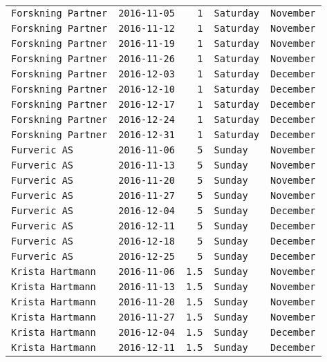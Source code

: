 \documentclass[11pt,A4paper,]{article}
\begin{document}
\begin{longtable}[]{@{}lrrll@{}}
\texttt{Forskning\ Partner} & \texttt{2016-11-05} & \texttt{1} &
\texttt{Saturday} & \texttt{November}\tabularnewline
\texttt{Forskning\ Partner} & \texttt{2016-11-12} & \texttt{1} &
\texttt{Saturday} & \texttt{November}\tabularnewline
\texttt{Forskning\ Partner} & \texttt{2016-11-19} & \texttt{1} &
\texttt{Saturday} & \texttt{November}\tabularnewline
\texttt{Forskning\ Partner} & \texttt{2016-11-26} & \texttt{1} &
\texttt{Saturday} & \texttt{November}\tabularnewline
\texttt{Forskning\ Partner} & \texttt{2016-12-03} & \texttt{1} &
\texttt{Saturday} & \texttt{December}\tabularnewline
\texttt{Forskning\ Partner} & \texttt{2016-12-10} & \texttt{1} &
\texttt{Saturday} & \texttt{December}\tabularnewline
\texttt{Forskning\ Partner} & \texttt{2016-12-17} & \texttt{1} &
\texttt{Saturday} & \texttt{December}\tabularnewline
\texttt{Forskning\ Partner} & \texttt{2016-12-24} & \texttt{1} &
\texttt{Saturday} & \texttt{December}\tabularnewline
\texttt{Forskning\ Partner} & \texttt{2016-12-31} & \texttt{1} &
\texttt{Saturday} & \texttt{December}\tabularnewline
\texttt{Furveric\ AS} & \texttt{2016-11-06} & \texttt{5} &
\texttt{Sunday} & \texttt{November}\tabularnewline
\texttt{Furveric\ AS} & \texttt{2016-11-13} & \texttt{5} &
\texttt{Sunday} & \texttt{November}\tabularnewline
\texttt{Furveric\ AS} & \texttt{2016-11-20} & \texttt{5} &
\texttt{Sunday} & \texttt{November}\tabularnewline
\texttt{Furveric\ AS} & \texttt{2016-11-27} & \texttt{5} &
\texttt{Sunday} & \texttt{November}\tabularnewline
\texttt{Furveric\ AS} & \texttt{2016-12-04} & \texttt{5} &
\texttt{Sunday} & \texttt{December}\tabularnewline
\texttt{Furveric\ AS} & \texttt{2016-12-11} & \texttt{5} &
\texttt{Sunday} & \texttt{December}\tabularnewline
\texttt{Furveric\ AS} & \texttt{2016-12-18} & \texttt{5} &
\texttt{Sunday} & \texttt{December}\tabularnewline
\texttt{Furveric\ AS} & \texttt{2016-12-25} & \texttt{5} &
\texttt{Sunday} & \texttt{December}\tabularnewline
\texttt{Krista\ Hartmann} & \texttt{2016-11-06} & \texttt{1.5} &
\texttt{Sunday} & \texttt{November}\tabularnewline
\texttt{Krista\ Hartmann} & \texttt{2016-11-13} & \texttt{1.5} &
\texttt{Sunday} & \texttt{November}\tabularnewline
\texttt{Krista\ Hartmann} & \texttt{2016-11-20} & \texttt{1.5} &
\texttt{Sunday} & \texttt{November}\tabularnewline
\texttt{Krista\ Hartmann} & \texttt{2016-11-27} & \texttt{1.5} &
\texttt{Sunday} & \texttt{November}\tabularnewline
\texttt{Krista\ Hartmann} & \texttt{2016-12-04} & \texttt{1.5} &
\texttt{Sunday} & \texttt{December}\tabularnewline
\texttt{Krista\ Hartmann} & \texttt{2016-12-11} & \texttt{1.5} &
\texttt{Sunday} & \texttt{December}\tabularnewline

\end{longtable}
\end{document}
